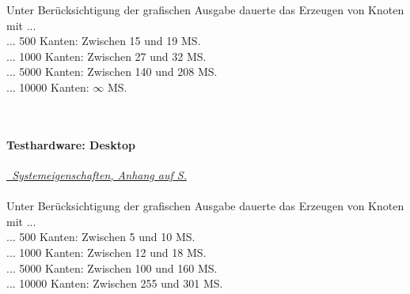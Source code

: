 \noindent
Unter Berücksichtigung der grafischen Ausgabe dauerte das  Erzeugen von Knoten mit ...\\

\noindent
... 500 Kanten: Zwischen 15 und 19 MS.\\
... 1000 Kanten: Zwischen 27 und 32 MS.\\
... 5000 Kanten: Zwischen 140 und 208 MS.\\
... 10000 Kanten: $\infty$ MS.

~\\

\paragraph*{Testhardware: Desktop}

\label{Abschnitt:Tests:Protokoll:Extrem:Knoten_Erzeugen:Desktop}

\textit{\hyperref[Anhang:Testsysteme:Desktop]{\mousecursor~Systemeigenschaften, Anhang auf S. \pageref{Anhang:Testsysteme:Desktop}}}\\~\\

Unter Berücksichtigung der grafischen Ausgabe dauerte das  Erzeugen von Knoten mit ...\\

\noindent
... 500 Kanten: Zwischen 5 und 10 MS.\\
... 1000 Kanten: Zwischen 12 und 18 MS.\\
... 5000 Kanten: Zwischen 100 und 160 MS.\\
... 10000 Kanten: Zwischen 255 und 301 MS.
